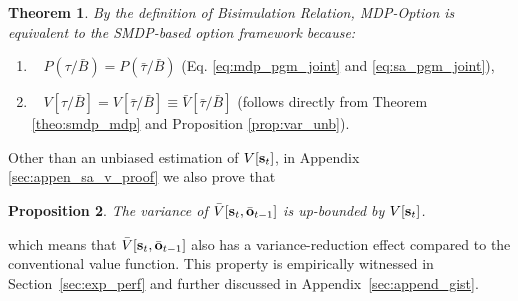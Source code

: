 \documentclass{article}
\newtheorem{thm}{Theorem}[section]
\newtheorem{prop}[thm]{Proposition}
\begin{document}
\begin{thm}
  \label{theo:smdp_sa}
  By the definition of Bisimulation Relation, \emph{MDP-Option} is equivalent to
  the SMDP-based option framework because:
\end{thm}
\begin{enumerate}
\item
  $\;\;\;$$P(\tau/\bar{B})=P(\bar{\tau}/\bar{B})$
  (Eq. \ref{eq:mdp_pgm_joint} and \ref{eq:sa_pgm_joint}),\\
\item
  $\;\;\;$$V[\tau/\bar{B}]=V[\bar{\tau}/\bar{B}]\equiv
  \bar{V}[\bar{\tau}/\bar{B}]$ (follows directly from Theorem
  \ref{theo:smdp_mdp} and Proposition \ref{prop:var_unb}).
\end{enumerate}

Other than an unbiased estimation of $V[{\mathbf{s}}_t]$, in Appendix
\ref{sec:appen_sa_v_proof} we also prove that
\begin{prop}
  \label{prop:var_red}
  The variance of $\bar{V}[{\mathbf{s}}_t,\bar{{\mathbf{o}}}_{t-1} ]$ is
  up-bounded by $V[ {\mathbf{s}}_t ]$.
\end{prop}
which means that $\bar{V}[{\mathbf{s}}_t,\bar{{\mathbf{o}}}_{t-1} ]$ also has a
variance-reduction effect compared to the conventional value
function. This property is empirically witnessed in
Section~\ref{sec:exp_perf} and further discussed in
Appendix~\ref{sec:append_gist}.
\end{document}

